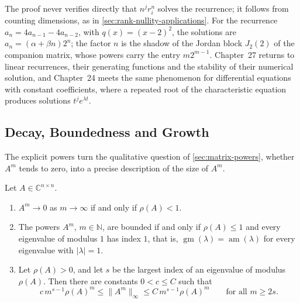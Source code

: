 The proof never verifies directly that $n^jr_i^n$ solves the recurrence; it follows from counting dimensions, as in \cref{sec:rank-nullity-applications}. For the recurrence $a_n=4a_{n-1}-4a_{n-2}$, with $q(x)=(x-2)^2$, the solutions are $a_n=(\alpha+\beta n)2^n$; the factor $n$ is the shadow of the Jordan block $J_2(2)$ of the companion matrix, whose powers carry the entry $m2^{m-1}$. Chapter~27 returns to linear recurrences, their generating functions and the stability of their numerical solution, and Chapter~24 meets the same phenomenon for differential equations with constant coefficients, where a repeated root of the characteristic equation produces solutions $t^je^{\lambda t}$.

\subsection{Decay, Boundedness and Growth}

The explicit powers turn the qualitative question of \cref{sec:matrix-powers}, whether $A^m$ tends to zero, into a precise description of the size of $A^m$.

\begin{theorem}
\label{thm:powers-size}
Let $A\in\mathbb C^{n\times n}$.
\begin{enumerate}
\item $A^m\to0$ as $m\to\infty$ if and only if $\rho(A)<1$.
\item The powers $A^m$, $m\in\mathbb N$, are bounded if and only if $\rho(A)\le1$ and every eigenvalue of modulus $1$ has index $1$, that is, $\operatorname{gm}(\lambda)=\operatorname{am}(\lambda)$ for every eigenvalue with $|\lambda|=1$.
\item Let $\rho(A)>0$, and let $s$ be the largest index of an eigenvalue of modulus $\rho(A)$. Then there are constants $0<c\le C$ such that
\[
c\,m^{s-1}\rho(A)^m\le\|A^m\|_\infty\le C\,m^{s-1}\rho(A)^m\qquad\text{for all }m\ge2s .
\]
\end{enumerate}
\end{theorem}

